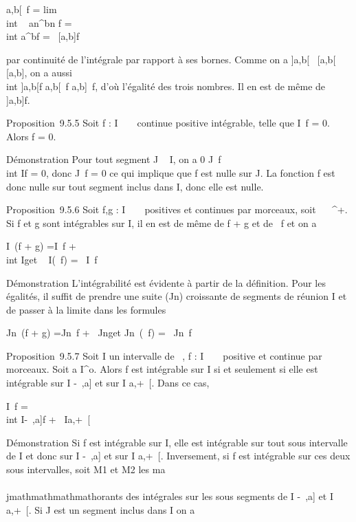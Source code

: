 \int  {]}a,b{[}~f
= lim\\int ~
an^bn f =\\int
 a^bf =\int ~
{[}a,b{]}f

par continuité de l'intégrale par rapport à ses bornes. Comme on a
{]}a,b{[}\subset~ {[}a,b{[}\subset~ {[}a,b{]}, on a aussi \\int
 {]}a,b{[}f \leq\int  {[}a,b{[}~f
\leq\int  {[}a,b{]}~f, d'où l'égalité des
trois nombres. Il en est de même de \int ~
{]}a,b{]}f.

Proposition~9.5.5 Soit f : I \rightarrow~ ~ continue positive intégrable, telle que
\int  I~f = 0. Alors f = 0.

Démonstration Pour tout segment J \subset~ I, on a 0
\leq\int  J~f \leq\\int
 If = 0, donc \int  J~f = 0 ce
qui implique que f est nulle sur J. La fonction f est donc nulle sur
tout segment inclus dans I, donc elle est nulle.

Proposition~9.5.6 Soit f,g : I \rightarrow~ ~ positives et continues par morceaux,
soit \alpha~ \in {}~^+. Si f et g sont intégrables sur I, il en est de
même de f + g et de \alpha~f et on a

\int  I~(f + g)
=\int  I~f +\\int
 Ig\text et \int ~
I(\alpha~f) = \alpha~\int  I~f

Démonstration L'intégrabilité est évidente à partir de la définition.
Pour les égalités, il suffit de prendre une suite (Jn)
croissante de segments de réunion I et de passer à la limite dans les
formules

\int  Jn~(f + g)
=\int  Jn~f
+\int ~
Jng\text et
\int  Jn~(\alpha~f) =
\alpha~\int  Jn~f

Proposition~9.5.7 Soit I un intervalle de ~, f : I \rightarrow~ ~ positive et
continue par morceaux. Soit a \in I^o. Alors f est intégrable
sur I si et seulement si elle est intégrable sur I\bigcap{]} -\infty~,a{]} et sur I
\bigcap {[}a,+\infty~{[}. Dans ce cas,

\int  I~f =\\int
 I\bigcap{]}-\infty~,a{]}f +\int ~
I\bigcap{[}a,+\infty~{[}

Démonstration Si f est intégrable sur I, elle est intégrable sur tout
sous intervalle de I et donc sur I\bigcap{]} -\infty~,a{]} et sur I \bigcap {[}a,+\infty~{[}.
Inversement, si f est intégrable sur ces deux sous intervalles, soit
M1 et M2 les ma\\\\jmathmathmathmathorants des intégrales sur les sous
segments de I\bigcap{]} -\infty~,a{]} et I \bigcap {[}a,+\infty~{[}. Si J est un segment inclus
dans I on a

